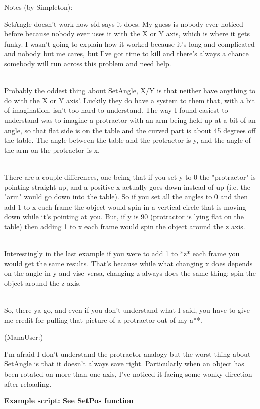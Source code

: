 \documentclass[
]{article}
\begin{document}
Notes (by Simpleton):

SetAngle doesn't work how sfd says it does. My guess is nobody ever
noticed before because nobody ever uses it with the X or Y axis, which
is where it gets funky. I wasn't going to explain how it worked because
it's long and complicated and nobody but me cares, but I've got time to
kill and there's always a chance somebody will run across this problem
and need help.\\
\strut \\
Probably the oddest thing about SetAngle, X/Y is that neither have
anything to do with the X or Y axis'. Luckily they do have a system to
them that, with a bit of imagination, isn't too hard to understand. The
way I found easiest to understand was to imagine a protractor with an
arm being held up at a bit of an angle, so that flat side is on the
table and the curved part is about 45 degrees off the table. The angle
between the table and the protractor is y, and the angle of the arm on
the protractor is x.\\
\strut \\
There are a couple differences, one being that if you set y to 0 the
"protractor" is pointing straight up, and a positive x actually goes
down instead of up (i.e. the "arm" would go down into the table). So if
you set all the angles to 0 and then add 1 to x each frame the object
would spin in a vertical circle that is moving down while it's pointing
at you. But, if y is 90 (protractor is lying flat on the table) then
adding 1 to x each frame would spin the object around the z axis.\\
\strut \\
Interestingly in the last example if you were to add 1 to *z* each frame
you would get the same results. That's because while what changing x
does depends on the angle in y and vise versa, changing z always does
the same thing: spin the object around the z axis.\\
\strut \\
So, there ya go, and even if you don't understand what I said, you have
to give me credit for pulling that picture of a protractor out of my
a**.

(ManaUser:)

I'm afraid I don't understand the protractor analogy but the worst thing
about SetAngle is that it doesn't always save right. Particularly when
an object has been rotated on more than one axis, I've noticed it facing
some wonky direction after reloading.

\textbf{Example script: See SetPos function}
\end{document}

